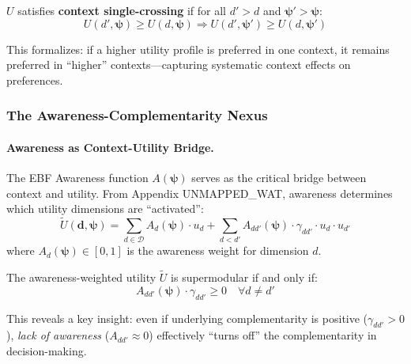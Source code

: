 \begin{definition}
\label{def:context-scp}
$U$ satisfies \textbf{context single-crossing} if for all $d' > d$ and 
$\boldsymbol{\psi}' > \boldsymbol{\psi}$:
\begin{equation}
U(d', \boldsymbol{\psi}) \geq U(d, \boldsymbol{\psi}) \Rightarrow 
U(d', \boldsymbol{\psi}') \geq U(d, \boldsymbol{\psi}')
\end{equation}
\end{definition}

This formalizes: if a higher utility profile is preferred in one context, it remains 
preferred in ``higher'' contexts---capturing systematic context effects on preferences.

\subsubsection{The Awareness-Complementarity Nexus}

\paragraph{Awareness as Context-Utility Bridge.}

The EBF Awareness function $A(\boldsymbol{\psi})$ serves as the critical bridge 
between context and utility. From Appendix UNMAPPED_WAT, awareness determines which utility 
dimensions are ``activated'':
\begin{equation}
\tilde{U}(\mathbf{d}, \boldsymbol{\psi}) = \sum_{d \in \mathcal{D}} 
A_d(\boldsymbol{\psi}) \cdot u_d + 
\sum_{d < d'} A_{dd'}(\boldsymbol{\psi}) \cdot \gamma_{dd'} \cdot u_d \cdot u_{d'}
\label{eq:awareness-utility}
\end{equation}
where $A_d(\boldsymbol{\psi}) \in [0,1]$ is the awareness weight for dimension $d$.

\begin{proposition}
\label{prop:awareness-super}
The awareness-weighted utility $\tilde{U}$ is supermodular if and only if:
\begin{equation}
A_{dd'}(\boldsymbol{\psi}) \cdot \gamma_{dd'} \geq 0 \quad \forall d \neq d'
\end{equation}
\end{proposition}

This reveals a key insight: even if underlying complementarity is positive 
($\gamma_{dd'} > 0$), \emph{lack of awareness} ($A_{dd'} \approx 0$) effectively 
``turns off'' the complementarity in decision-making.


